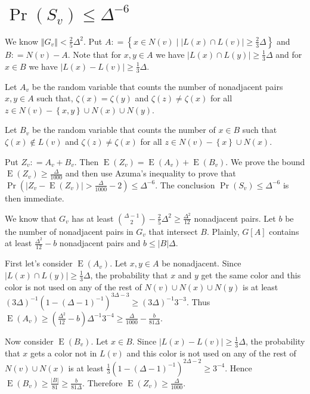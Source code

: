 \documentclass[12pt]{article}
\theoremstyle{plain}
\theoremstyle{definition}
\theoremstyle{remark}
\newcommand{\set}[1]{\left\{ #1 \right\}}
\newcommand{\setb}[3]{\left\{ #1 \in #2 \mid #3 \right\}}
\newcommand{\card}[1]{\left|#1\right|}
\newcommand{\size}[1]{\left\Vert#1\right\Vert}
\newcommand{\DefinedAs}{\mathrel{\mathop:}=}
\newcommand{\ex}{\operatorname{E}}
\begin{document}
\section{$\Pr(S_v) \leq \Delta^{-6}$}
We know $\size{G_v} < \frac25 \Delta^2$.  Put $A \DefinedAs
\setb{x}{N(v)}{\card{L(x) \cap L(v)} \geq \frac23 \Delta}$ and $B \DefinedAs
N(v) - A$.  Note that for $x, y \in A$ we have $\card{L(x) \cap L(y)} \geq
\frac13 \Delta$ and for $x \in B$ we have $\card{L(x) - L(v)} \geq \frac13
\Delta$.

Let $A_v$ be the random variable that counts the number of nonadjacent pairs
$x, y \in A$ such that, $\zeta(x) = \zeta(y)$ and $\zeta(z) \neq \zeta(x)$ for
all $z \in N(v) - \set{x, y} \cup N(x) \cup N(y)$.

Let $B_v$ be the random variable that counts the number of $x \in B$ such that
$\zeta(x) \not \in L(v)$ and $\zeta(z) \neq \zeta(x)$ for all $z \in N(v) -
\set{x} \cup N(x)$.

Put $Z_v \DefinedAs A_v + B_v$.  Then $\ex(Z_v) = \ex(A_v) + \ex(B_v)$.  We
prove the bound $\ex(Z_v) \geq \frac{\Delta}{1000}$ and then use Azuma's
inequality to prove that $\Pr(\card{Z_v - \ex(Z_v)} > \frac{\Delta}{1000} - 2)
\leq \Delta^{-6}$. The conclusion $\Pr(S_v) \leq \Delta^{-6}$ is then immediate.

We know that $G_v$ has at least $\binom{\Delta - 1}{2} - \frac25 \Delta^2 \geq
\frac{\Delta^2}{12}$ nonadjacent pairs.  Let $b$ be the number of nonadjacent pairs in $G_v$ that intersect $B$. 
Plainly, $G[A]$ contains at least $\frac{\Delta^2}{12} - b$ nonadjacent pairs
and $b \leq \card{B}\Delta$.

First let's consider $\ex(A_v)$.  Let $x, y \in A$ be nonadjacent.  Since $\card{L(x) \cap L(y)} \geq
\frac13 \Delta$, the probability that $x$ and $y$ get the same color and this
color is not used on any of the rest of $N(v) \cup N(x) \cup N(y)$ is at least
$(3\Delta)^{-1} (1-(\Delta-1)^{-1})^{3\Delta - 3} \geq (3\Delta)^{-1}3^{-3}$. 
Thus $\ex(A_v) \geq (\frac{\Delta^2}{12} - b)\Delta^{-1}3^{-4} \geq
\frac{\Delta}{1000} - \frac{b}{81\Delta}$.

Now consider $\ex(B_v)$.  Let $x \in B$.  Since $\card{L(x) - L(v)} \geq \frac13
\Delta$, the probability that $x$ gets a color not in $L(v)$ and this color is
not used on any of the rest of $N(v) \cup N(x)$ is at least $\frac13
(1-(\Delta-1)^{-1})^{2\Delta - 2} \geq 3^{-4}$.  Hence $\ex(B_v) \geq
\frac{\card{B}}{81} \geq \frac{b}{81\Delta}$.  Therefore $\ex(Z_v) \geq
\frac{\Delta}{1000}$.
\end{document}
